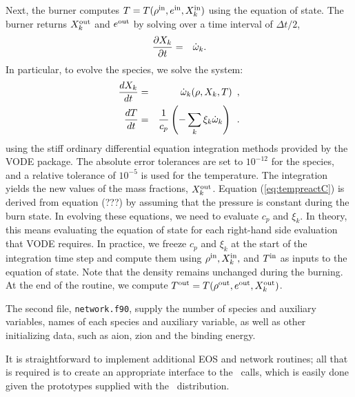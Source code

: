 Next, the burner computes $T = T(\rho^{\rm in},e^{\rm in},X_k^{\rm in})$ using the
equation of state.  The burner returns $X_k^{\rm out}$ and $e^{\rm out}$ by
solving over a time interval of $\Delta t/2$,
\begin{eqnarray}
\frac{\partial X_k}{\partial t} &=& \dot\omega_k.\\
\end{eqnarray}
In particular, to evolve the species, we solve the system:
\begin{eqnarray}
\frac{dX_k}{dt} &=& \dot\omega_k(\rho,X_k,T)\enskip, \label{eq:VODE1C} \\
\frac{dT}{dt} &=&\frac{1}{c_p} \left ( -\sum_k \xi_k  \dot\omega_k  \right )\enskip. \label{eq:tempreactC}
\end{eqnarray}
using the stiff ordinary differential equation integration methods
provided by the VODE package.  The absolute error tolerances are set
to $10^{-12}$ for the species, and a relative tolerance of $10^{-5}$
is used for the temperature.  The integration yields the new values of
the mass fractions, $X_k^{\rm out}$.  Equation (\ref{eq:tempreactC}) is
derived from equation (???) by assuming that the pressure is constant
during the burn state.  In evolving these equations, we need to
evaluate $c_p$ and $\xi_k$.  In theory, this means evaluating the
equation of state for each right-hand side evaluation that VODE
requires.  In practice, we freeze $c_p$ and $\xi_k$ at the start of
the integration time step and compute them using $\rho^{\rm in},
X_k^{\rm in},$ and $T^{\rm in}$ as inputs to the equation of state.  Note that
the density remains unchanged during the burning.  At the end of the
routine, we compute $T^{\rm out} = T(\rho^{\rm out},e^{{\rm out}},X_k^{\rm out})$.

The second file, {\tt network.f90}, supply the number of species and
auxiliary variables, names of each species and auxiliary variable, as
well as other initializing data, such as aion, zion and the binding
energy.

It is straightforward to implement additional EOS and network
routines; all that is required is to create an appropriate interface
to the \castro\ calls, which is easily done given the prototypes
supplied with the \castro\ distribution.

